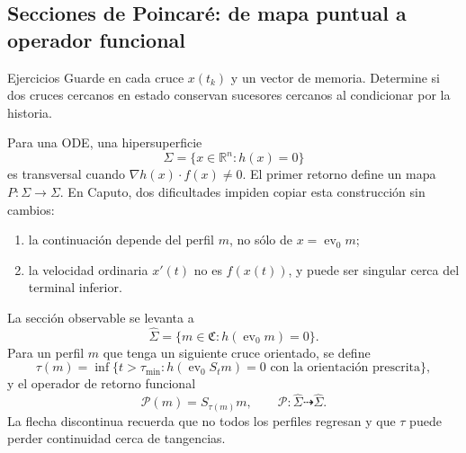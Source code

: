 \subsection{Secciones de Poincaré: de mapa puntual a operador funcional}

\ifHAFOPedagogy
\begin{bloqueestudio}{Ejercicios}
Guarde en cada cruce \(x(t_k)\) y un vector de memoria. Determine si dos cruces
cercanos en estado conservan sucesores cercanos al condicionar por la historia.
\end{bloqueestudio}
\fi

Para una ODE, una hipersuperficie
\begin{equation}
 \Sigma=\{x\in\mathbb R^n:h(x)=0\}
 \label{eq:geofo-point-section}
\end{equation}
es transversal cuando \(\nabla h(x)\cdot f(x)\neq0\). El primer retorno define
un mapa \(P:\Sigma\to\Sigma\). En Caputo, dos dificultades impiden copiar esta
construcción sin cambios:
\begin{enumerate}
 \item la continuación depende del perfil \(m\), no sólo de
 \(x=\operatorname{ev}_0m\);
 \item la velocidad ordinaria \(x'(t)\) no es \(f(x(t))\), y puede ser singular
 cerca del terminal inferior.
\end{enumerate}

La sección observable se levanta a
\begin{equation}
 \widehat\Sigma=
 \{m\in\mathfrak C:h(\operatorname{ev}_0m)=0\}.
 \label{eq:geofo-functional-section}
\end{equation}
Para un perfil \(m\) que tenga un siguiente cruce orientado, se define
\begin{equation}
 \tau(m)=\inf\{t>\tau_{\min}:
 h(\operatorname{ev}_0S_tm)=0
 \text{ con la orientación prescrita}\},
 \label{eq:geofo-return-time}
\end{equation}
y el operador de retorno funcional
\begin{equation}
 \mathcal P(m)=S_{\tau(m)}m,
 \qquad \mathcal P:\widehat\Sigma\dashrightarrow\widehat\Sigma.
 \label{eq:geofo-functional-poincare}
\end{equation}
La flecha discontinua recuerda que no todos los perfiles regresan y que
\(\tau\) puede perder continuidad cerca de tangencias.

